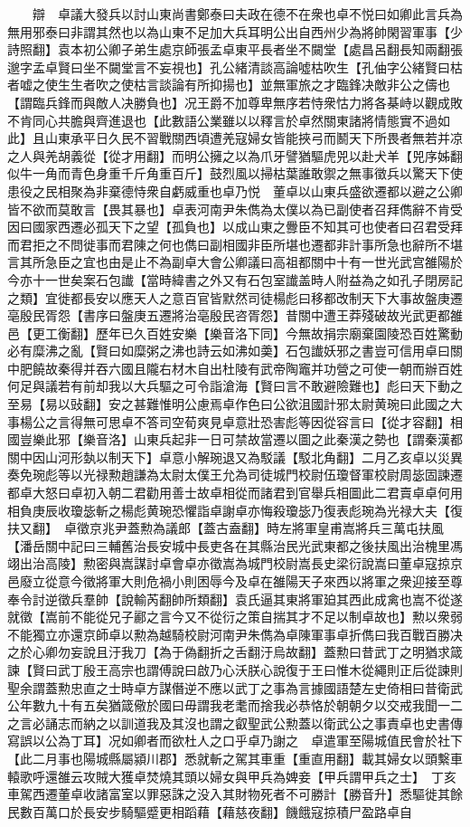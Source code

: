 　　辯　卓議大發兵以討山東尚書鄭泰曰夫政在德不在衆也卓不悦曰如卿此言兵為無用邪泰曰非謂其然也以為山東不足加大兵耳明公出自西州少為將帥閑習軍事【少詩照翻】袁本初公卿子弟生處京師張孟卓東平長者坐不闚堂【處昌呂翻長知兩翻張邈字孟卓賢曰坐不闚堂言不妄視也】孔公緒清談高論噓枯吹生【孔伷字公緒賢曰枯者嘘之使生生者吹之使枯言談論有所抑揚也】並無軍旅之才臨鋒决敵非公之儔也【謂臨兵鋒而與敵人决勝負也】况王爵不加尊卑無序若恃衆怙力將各棊峙以觀成敗不肯同心共膽與齊進退也【此數語公業雖以以釋言於卓然關東諸將情態實不過如此】且山東承平日久民不習戰關西頃遭羌寇婦女皆能挾弓而鬭天下所畏者無若并凉之人與羌胡義從【從才用翻】而明公擁之以為爪牙譬猶驅虎兕以赴犬羊【兕序姊翻似牛一角而青色身重千斤角重百斤】鼓烈風以掃枯葉誰敢禦之無事徵兵以驚天下使患役之民相聚為非棄德恃衆自虧威重也卓乃悦　董卓以山東兵盛欲遷都以避之公卿皆不欲而莫敢言【畏其暴也】卓表河南尹朱儁為太僕以為已副使者召拜儁辭不肯受因曰國家西遷必孤天下之望【孤負也】以成山東之釁臣不知其可也使者曰召君受拜而君拒之不問徙事而君陳之何也儁曰副相國非臣所堪也遷都非計事所急也辭所不堪言其所急臣之宜也由是止不為副卓大會公卿議曰高祖都關中十有一世光武宫雒陽於今亦十一世矣案石包䜟【當時緯書之外又有石包室䜟盖時人附益為之如孔子閉房記之類】宜徙都長安以應天人之意百官皆默然司徒楊彪曰移都改制天下大事故盤庚遷亳殷民胥怨【書序曰盤庚五遷將治亳殷民咨胥怨】昔關中遭王莽殘破故光武更都雒邑【更工衡翻】歷年已久百姓安樂【樂音洛下同】今無故捐宗廟棄園陵恐百姓驚動必有糜沸之亂【賢曰如糜粥之沸也詩云如沸如羮】石包䜟妖邪之書豈可信用卓曰關中肥饒故秦得并吞六國且隴右材木自出杜陵有武帝陶竈并功營之可使一朝而辦百姓何足與議若有前却我以大兵驅之可令詣滄海【賢曰言不敢避險難也】彪曰天下動之至易【易以䜴翻】安之甚難惟明公慮焉卓作色曰公欲沮國計邪太尉黄琬曰此國之大事楊公之言得無可思卓不答司空荀爽見卓意壯恐害彪等因從容言曰【從才容翻】相國豈樂此邪【樂音洛】山東兵起非一日可禁故當遷以圖之此秦漢之勢也【謂秦漢都關中因山河形埶以制天下】卓意小解琬退又為駁議【駁北角翻】二月乙亥卓以災異奏免琬彪等以光禄勲趙謙為太尉太僕王允為司徒城門校尉伍瓊督軍校尉周毖固諫遷都卓大怒曰卓初入朝二君勸用善士故卓相從而諸君到官舉兵相圖此二君賣卓卓何用相負庚辰收瓊毖斬之楊彪黄琬恐懼詣卓謝卓亦悔殺瓊毖乃復表彪琬為光禄大夫【復扶又翻】　卓徵京兆尹蓋勲為議郎【蓋古盍翻】時左將軍皇甫嵩將兵三萬屯扶風【潘岳關中記曰三輔舊治長安城中長吏各在其縣治民光武東都之後扶風出治槐里馮翊出治高陵】勲密與嵩謀討卓會卓亦徵嵩為城門校尉嵩長史梁衍說嵩曰董卓寇掠京邑廢立從意今徵將軍大則危禍小則困辱今及卓在雒陽天子來西以將軍之衆迎接至尊奉令討逆徵兵羣帥【說輸芮翻帥所類翻】袁氏逼其東將軍廹其西此成禽也嵩不從遂就徵【嵩前不能從兄子酈之言今又不從衍之策自揣其才不足以制卓故也】勲以衆弱不能獨立亦還京師卓以勲為越騎校尉河南尹朱儁為卓陳軍事卓折儁曰我百戰百勝决之於心卿勿妄說且汙我刀【為于偽翻折之舌翻汙烏故翻】蓋勲曰昔武丁之明猶求箴諫【賢曰武丁殷王高宗也謂傅說曰啟乃心沃朕心說復于王曰惟木從繩則正后從諫則聖余謂蓋勲忠直之士時卓方謀僭逆不應以武丁之事為言據國語楚左史倚相曰昔衛武公年數九十有五矣猶箴儆於國曰毋謂我老耄而捨我必恭恪於朝朝夕以交戒我聞一二之言必誦志而納之以訓道我及其沒也謂之叡聖武公勲蓋以衛武公之事責卓也史書傳寫誤以公為丁耳】况如卿者而欲杜人之口乎卓乃謝之　卓遣軍至陽城值民會於社下【此二月事也陽城縣屬潁川郡】悉就斬之駕其車重【重直用翻】載其婦女以頭繫車轅歌呼還雒云攻賊大獲卓焚燒其頭以婦女與甲兵為婢妾【甲兵謂甲兵之士】　丁亥車駕西遷董卓收諸富室以罪惡誅之没入其財物死者不可勝計【勝音升】悉驅徙其餘民數百萬口於長安步騎驅蹙更相蹈藉【藉慈夜翻】饑餓寇掠積尸盈路卓自